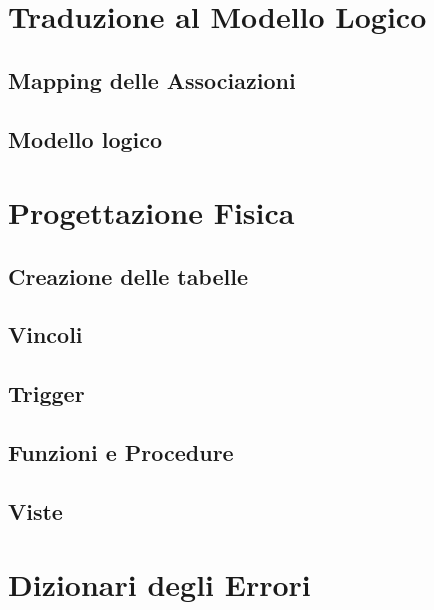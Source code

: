 \documentclass{article}
\begin{document}
\newpage
\section{Traduzione al Modello Logico}

\subsection{Mapping delle Associazioni}

\newpage

\subsection{Modello logico}


\section{Progettazione Fisica}

\subsection{Creazione delle tabelle}

\newpage

\subsection{Vincoli}


\newpage
\subsection{Trigger}


\newpage
\subsection{Funzioni e Procedure}


\newpage
\subsection{Viste}


\newpage
\section{Dizionari degli Errori}

\end{document}
